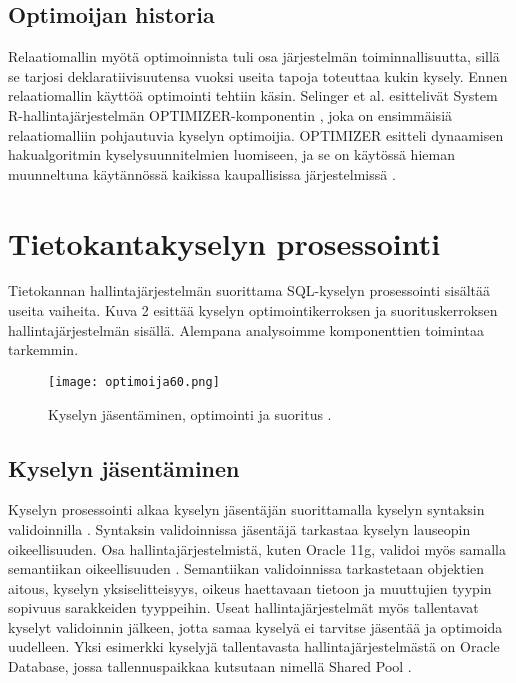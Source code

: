 \documentclass[finnish]{tktltiki2}
\theoremstyle{definition}
\theoremstyle{remark}
\begin{document}
\subsection{Optimoijan historia}
Relaatiomallin myötä optimoinnista tuli osa järjestelmän toiminnallisuutta, sillä se tarjosi deklaratiivisuutensa vuoksi useita tapoja toteuttaa kukin kysely. Ennen relaatiomallin käyttöä optimointi tehtiin käsin.
Selinger et al. esittelivät System R-hallintajärjestelmän OPTIMIZER-komponentin \cite{selinger1979access}, joka on ensimmäisiä relaatiomalliin pohjautuvia kyselyn optimoijia. OPTIMIZER esitteli dynaamisen hakualgoritmin kyselysuunnitelmien luomiseen, ja se on käytössä hieman muunneltuna käytännössä kaikissa kaupallisissa järjestelmissä \cite{ioannidis1996query}. 



\section{Tietokantakyselyn prosessointi}
Tietokannan hallintajärjestelmän suorittama SQL-kyselyn prosessointi sisältää useita vaiheita. Kuva 2 esittää kyselyn optimointikerroksen ja suorituskerroksen hallintajärjestelmän sisällä. Alempana analysoimme komponenttien toimintaa tarkemmin.

\begin{figure}[!h]
  \caption{Kyselyn jäsentäminen, optimointi ja suoritus \cite{ramakrishnan2003database}.}
  \centering
    \texttt{[image: optimoija60.png]}
\end{figure}

\subsection{Kyselyn jäsentäminen}
Kyselyn prosessointi alkaa kyselyn jäsentäjän suorittamalla kyselyn syntaksin validoinnilla \cite{selinger1979access}. Syntaksin validoinnissa jäsentäjä tarkastaa kyselyn lauseopin oikeellisuuden. Osa hallintajärjestelmistä, kuten Oracle 11g, validoi myös samalla semantiikan oikeellisuuden \cite{oracle2009doc}. 
Semantiikan validoinnissa tarkastetaan objektien aitous, kyselyn yksiselitteisyys, oikeus haettavaan tietoon ja muuttujien tyypin sopivuus sarakkeiden tyyppeihin. Useat hallintajärjestelmät myös
tallentavat kyselyt validoinnin jälkeen, jotta samaa kyselyä ei tarvitse jäsentää ja optimoida uudelleen. Yksi esimerkki kyselyjä tallentavasta hallintajärjestelmästä on Oracle Database, jossa tallennuspaikkaa kutsutaan nimellä Shared Pool \cite{oracle2005doc}. 
\end{document}
